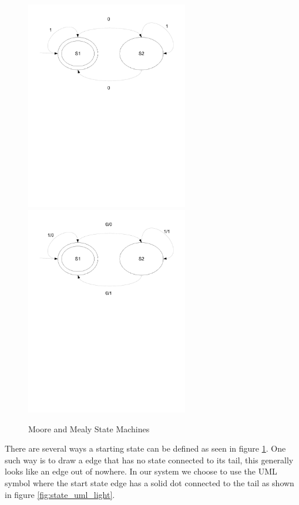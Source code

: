 \begin{figure}[htp]
    \centering
    \includegraphics[trim= 15mm 150mm 15mm 10mm, clip ,width=200pt]{./images/state_moore.pdf} 
    \includegraphics[trim= 15mm 150mm 15mm 10mm, clip ,width=200pt]{./images/state_mealy.pdf}    
    \caption{Moore and Mealy State Machines}
    \label{fig:state_moore_mealy}
\end{figure}

There are several ways a starting state can be defined as seen in figure \ref{fig:state_moore_mealy}.
One such way is to draw a edge that has no state connected to its tail, this generally looks like an edge out of nowhere. In our system we choose to use the UML symbol where the start state edge has a solid dot connected to the tail as shown in figure \ref{fig:state_uml_light}.

